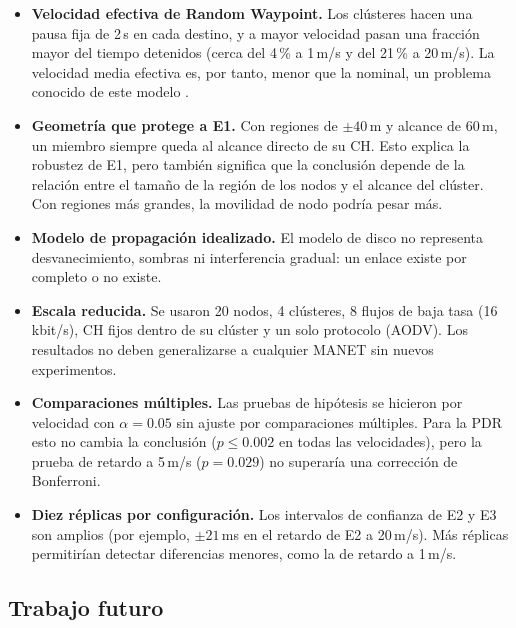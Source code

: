 \begin{itemize}
    \item \textbf{Velocidad efectiva de Random Waypoint.} Los clústeres hacen una pausa
    fija de 2\,s en cada destino, y a mayor velocidad pasan una fracción mayor del tiempo
    detenidos (cerca del 4\,\% a 1\,m/s y del 21\,\% a 20\,m/s). La velocidad media
    efectiva es, por tanto, menor que la nominal, un problema conocido de este modelo
    \cite{yoon2003harmful, navidi2004stationary}.

    \item \textbf{Geometría que protege a E1.} Con regiones de $\pm 40$\,m y alcance de
    60\,m, un miembro siempre queda al alcance directo de su CH. Esto explica la robustez
    de E1, pero también significa que la conclusión depende de la relación entre el
    tamaño de la región de los nodos y el alcance del clúster. Con regiones más grandes,
    la movilidad de nodo podría pesar más.

    \item \textbf{Modelo de propagación idealizado.} El modelo de disco no representa
    desvanecimiento, sombras ni interferencia gradual: un enlace existe por completo o no
    existe.

    \item \textbf{Escala reducida.} Se usaron 20 nodos, 4 clústeres, 8 flujos de baja
    tasa (16\,kbit/s), CH fijos dentro de su clúster y un solo protocolo (AODV). Los
    resultados no deben generalizarse a cualquier MANET sin nuevos experimentos.

    \item \textbf{Comparaciones múltiples.} Las pruebas de hipótesis se hicieron por
    velocidad con $\alpha = 0.05$ sin ajuste por comparaciones múltiples. Para la PDR
    esto no cambia la conclusión ($p \leq 0.002$ en todas las velocidades), pero la
    prueba de retardo a 5\,m/s ($p = 0.029$) no superaría una corrección de Bonferroni.

    \item \textbf{Diez réplicas por configuración.} Los intervalos de confianza de E2 y
    E3 son amplios (por ejemplo, $\pm 21$\,ms en el retardo de E2 a 20\,m/s). Más
    réplicas permitirían detectar diferencias menores, como la de retardo a 1\,m/s.
\end{itemize}

\subsection{Trabajo futuro}

